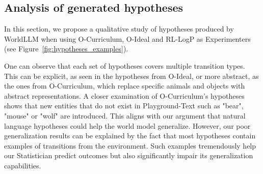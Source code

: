 \documentclass{article}
\begin{document}
\subsection{Analysis of generated hypotheses} \label{app:generated_hypotheses}
In this section, we propose a qualitative study of hypotheses produced by WorldLLM when using O-Curriculum, O-Ideal and RL-LogP as Experimenters (see Figure~\ref{fig:hypotheses_examples}).

One can observe that each set of hypotheses covers multiple transition types. This can be explicit, as seen in the hypotheses from O-Ideal, or more abstract, as the ones from O-Curriculum, which replace specific animals and objects with abstract representations. A closer examination of O-Curriculum's hypotheses shows that new entities that do not exist in Playground-Text such as "bear", "mouse" or "wolf" are introduced. This aligns with our argument that natural language hypotheses could help the world model generalize.
However, our poor generalization results can be explained by the fact that most hypotheses contain examples of transitions from the environment. Such examples tremendously help our Statistician predict outcomes but also significantly impair its generalization capabilities.
\end{document}
